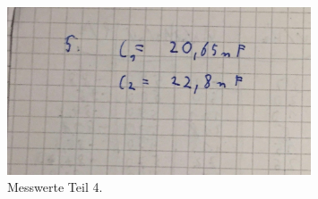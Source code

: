 \begin{figure}
  \centering
  \includegraphics[width=0.8\textwidth]{Messwerte/4.jpg}
  \caption{Messwerte Teil 4.}
  \label{fig:messwerte4}
\end{figure}
